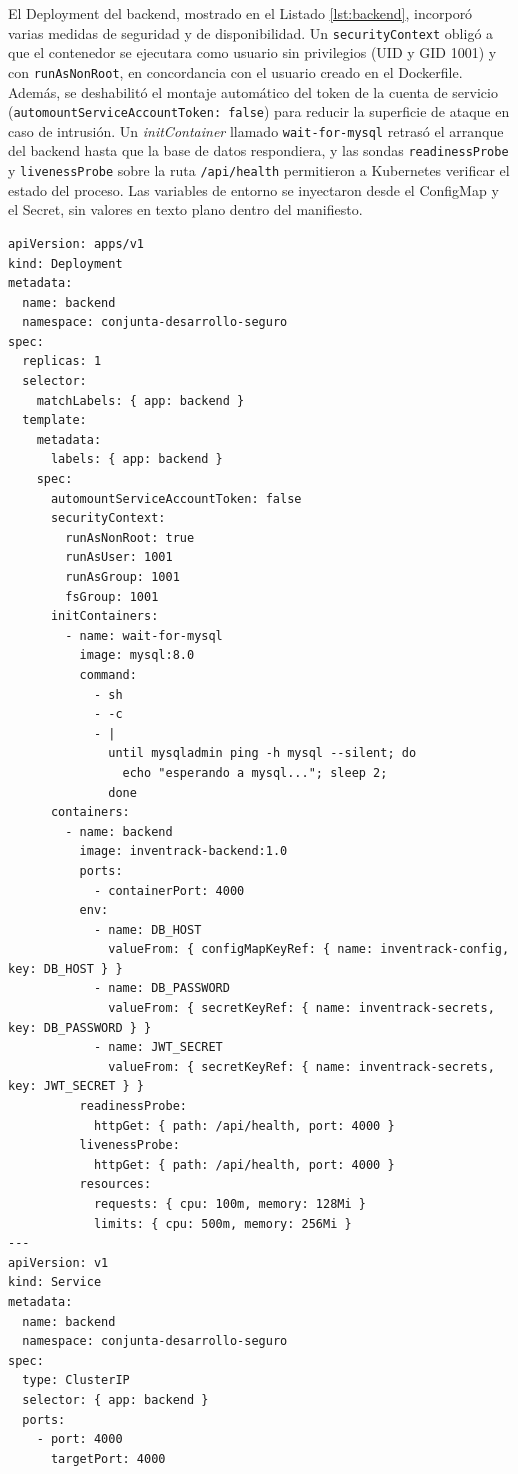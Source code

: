 \documentclass[stu,11pt,spanish,floatsintext]{apa7}
\begin{document}
El Deployment del backend, mostrado en el Listado \ref{lst:backend}, incorporó varias medidas de seguridad y de disponibilidad. Un \texttt{securityContext} obligó a que el contenedor se ejecutara como usuario sin privilegios (UID y GID 1001) y con \texttt{runAsNonRoot}, en concordancia con el usuario creado en el Dockerfile. Además, se deshabilitó el montaje automático del token de la cuenta de servicio (\texttt{automountServiceAccountToken: false}) para reducir la superficie de ataque en caso de intrusión. Un \textit{initContainer} llamado \texttt{wait-for-mysql} retrasó el arranque del backend hasta que la base de datos respondiera, y las sondas \texttt{readinessProbe} y \texttt{livenessProbe} sobre la ruta \texttt{/api/health} permitieron a Kubernetes verificar el estado del proceso. Las variables de entorno se inyectaron desde el ConfigMap y el Secret, sin valores en texto plano dentro del manifiesto.

\begin{lstlisting}[caption={Deployment y Service del backend (04-backend.yaml)},label=lst:backend]
apiVersion: apps/v1
kind: Deployment
metadata:
  name: backend
  namespace: conjunta-desarrollo-seguro
spec:
  replicas: 1
  selector:
    matchLabels: { app: backend }
  template:
    metadata:
      labels: { app: backend }
    spec:
      automountServiceAccountToken: false
      securityContext:
        runAsNonRoot: true
        runAsUser: 1001
        runAsGroup: 1001
        fsGroup: 1001
      initContainers:
        - name: wait-for-mysql
          image: mysql:8.0
          command:
            - sh
            - -c
            - |
              until mysqladmin ping -h mysql --silent; do
                echo "esperando a mysql..."; sleep 2;
              done
      containers:
        - name: backend
          image: inventrack-backend:1.0
          ports:
            - containerPort: 4000
          env:
            - name: DB_HOST
              valueFrom: { configMapKeyRef: { name: inventrack-config, key: DB_HOST } }
            - name: DB_PASSWORD
              valueFrom: { secretKeyRef: { name: inventrack-secrets, key: DB_PASSWORD } }
            - name: JWT_SECRET
              valueFrom: { secretKeyRef: { name: inventrack-secrets, key: JWT_SECRET } }
          readinessProbe:
            httpGet: { path: /api/health, port: 4000 }
          livenessProbe:
            httpGet: { path: /api/health, port: 4000 }
          resources:
            requests: { cpu: 100m, memory: 128Mi }
            limits: { cpu: 500m, memory: 256Mi }
---
apiVersion: v1
kind: Service
metadata:
  name: backend
  namespace: conjunta-desarrollo-seguro
spec:
  type: ClusterIP
  selector: { app: backend }
  ports:
    - port: 4000
      targetPort: 4000
\end{lstlisting}
\end{document}
